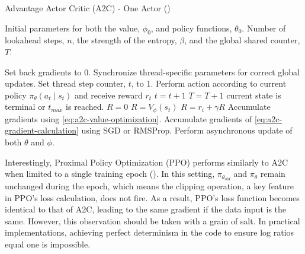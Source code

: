             \begin{algorithm}[ht]
            \caption{Advantage Actor Critic (A2C) - One Actor (\cite{mnih2016asynchronous})} 
            \label{alg:A2C}
            
            \begin{algorithmic}[1]
            \State {} Initial parameters for both the value, $\phi_0$, and policy functions, $\theta_0$.
            \State {} Number of lookahead steps, $n$, the strength of the entropy, $\beta$, and the global shared counter, $T$.
            
            \Repeat
                \State Set back gradients to 0.
                \State Synchronize thread-specific parameters for correct global updates.
                \State Set thread step counter, $t$, to 1.
                \Repeat
                    \State Perform action according to current policy $\pi_{\theta}(a_t \mid s_t)$ and receive reward $r_t$
                    \State $t = t + 1$
                    \State $T = T + 1$
                \Until current state is terminal or $t_{max}$ is reached.
                    \State $R = 0$
                \Else
                    \State $R = V_{\phi}(s_t)$
                \EndIf
                    \State $R = r_i + \gamma R$
                    \State Accumulate gradients using \textcolor{deepblue}{\autoref{eq:a2c-value-optimization}}.
                    \State Accumulate gradients of \textcolor{deepblue}{\autoref{eq:a2c-gradient-calculation}} using SGD or RMSProp.
                \EndFor
                \State Perform asynchronous update of both $\theta$ and $\phi$.
            \end{algorithmic}
            \end{algorithm}
            
            \bigskip
            
            \noindent 
            Interestingly, Proximal Policy Optimization (PPO) performs similarly to A2C when limited to a single training epoch (\textcolor{deepblue}{\cite{huang2022a2c}}). In this setting, $\pi_{\theta_{old}}$ and $\pi_{\theta}$ remain unchanged during the epoch, which means the clipping operation, a key feature in PPO's loss calculation, does not fire. As a result, PPO's loss function becomes identical to that of A2C, leading to the same gradient if the data input is the same. 
            However, this observation should be taken with a grain of salt. In practical implementations, achieving perfect determinism in the code to ensure log ratios equal one is impossible.



